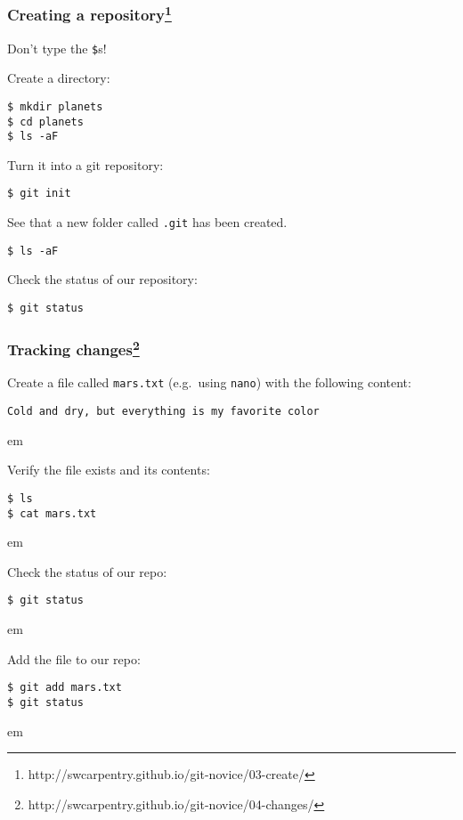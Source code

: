 \documentclass[aspectratio=1610]{beamer}
\begin{document}
\begin{frame}[fragile]
\frametitle{Creating a repository\footnote{http://swcarpentry.github.io/git-novice/03-create/}}

\textcolor{red!50!black}{Don't type the \texttt{\$}s!}

Create a directory:
\begin{verbatim}
$ mkdir planets
$ cd planets
$ ls -aF
\end{verbatim}

\pause
Turn it into a git repository:
\begin{verbatim}
$ git init
\end{verbatim}
\pause

See that a new folder called \texttt{.git} has been created.
\begin{verbatim}
$ ls -aF
\end{verbatim}
\pause

Check the status of our repository:
\begin{verbatim}
$ git status
\end{verbatim}

\end{frame}

\begin{frame}[fragile]
  \frametitle{Tracking changes\footnote{http://swcarpentry.github.io/git-novice/04-changes/}}

  Create a file called \texttt{mars.txt} (e.g.~using \texttt{nano}) with the following content:

\begin{verbatim}
Cold and dry, but everything is my favorite color
\end{verbatim}

  \pause

 em

Verify the file exists and its contents:

\begin{verbatim}
$ ls
$ cat mars.txt
\end{verbatim}

\pause

 em

Check the status of our repo:
\begin{verbatim}
$ git status
\end{verbatim}

 em
\pause

Add the file to our repo:
\begin{verbatim}
$ git add mars.txt
$ git status
\end{verbatim}

 em
\pause


\end{frame}
\end{document}
